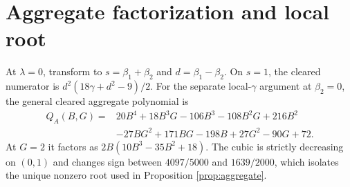 \section{Aggregate factorization and local root}
At $\lambda=0$, transform to $s=\beta_1+\beta_2$ and $d=\beta_1-\beta_2$. On $s=1$, the cleared numerator is $d^2(18\gamma+d^2-9)/2$. For the separate local-$\gamma$ argument at $\beta_2=0$, the general cleared aggregate polynomial is
\begin{align*}
Q_A(B,G)=&20B^4+18B^3G-106B^3-108B^2G+216B^2\\
&-27BG^2+171BG-198B+27G^2-90G+72.
\end{align*}
At $G=2$ it factors as $2B(10B^3-35B^2+18)$. The cubic is strictly decreasing on $(0,1)$ and changes sign between $4097/5000$ and $1639/2000$, which isolates the unique nonzero root used in Proposition \ref{prop:aggregate}.
